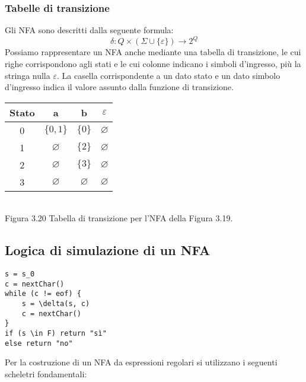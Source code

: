     \subsubsection{Tabelle di transizione}
    Gli NFA sono descritti dalla seguente formula:
    \[\delta : Q \times (\Sigma \cup \{\varepsilon\}) \rightarrow 2^{Q}\]
    Possiamo rappresentare un NFA anche mediante una tabella di transizione, le cui righe corrispondono agli stati e le cui colonne indicano i simboli d'ingresso, più la stringa nulla $\varepsilon$. La casella corrispondente a un dato stato e un dato simbolo d'ingresso indica il valore assunto dalla funzione di transizione.
    
    \begin{center}
    \begin{tabular}{c|c|c|c}
    \textbf{Stato} & \textbf{a} & \textbf{b} & $\varepsilon$ \\
    \hline
    0 & $\{0,1\}$ & $\{0\}$ & $\varnothing$ \\
    1 & $\varnothing$ & $\{2\}$ & $\varnothing$ \\
    2 & $\varnothing$ & $\{3\}$ & $\varnothing$ \\
    3 & $\varnothing$ & $\varnothing$ & $\varnothing$ \\
    \end{tabular}
    \\
    \footnotesize Figura 3.20 \quad Tabella di transizione per l'NFA della Figura 3.19.
    \end{center}
    

\subsection{Logica di simulazione di un NFA}

\begin{verbatim}
s = s_0
c = nextChar()
while (c != eof) {
    s = \delta(s, c)
    c = nextChar()
}
if (s \in F) return "sì"
else return "no"
\end{verbatim}

Per la costruzione di un NFA da espressioni regolari si utilizzano i seguenti scheletri fondamentali:


